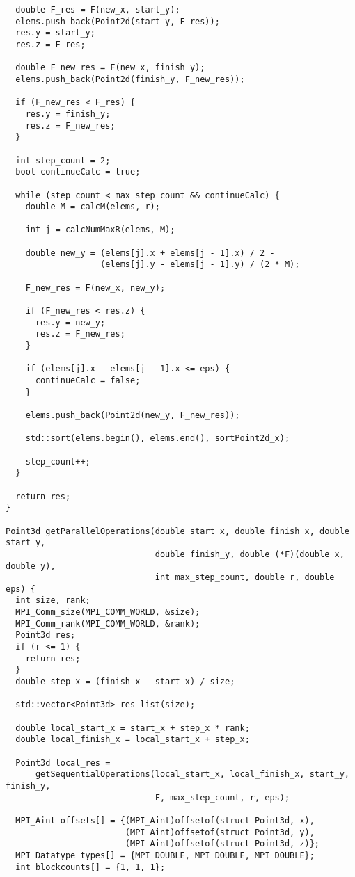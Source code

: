 \documentclass{report}
\begin{document}
\begin{lstlisting}
  double F_res = F(new_x, start_y);
  elems.push_back(Point2d(start_y, F_res));
  res.y = start_y;
  res.z = F_res;

  double F_new_res = F(new_x, finish_y);
  elems.push_back(Point2d(finish_y, F_new_res));

  if (F_new_res < F_res) {
    res.y = finish_y;
    res.z = F_new_res;
  }

  int step_count = 2;
  bool continueCalc = true;

  while (step_count < max_step_count && continueCalc) {
    double M = calcM(elems, r);

    int j = calcNumMaxR(elems, M);

    double new_y = (elems[j].x + elems[j - 1].x) / 2 -
                   (elems[j].y - elems[j - 1].y) / (2 * M);

    F_new_res = F(new_x, new_y);

    if (F_new_res < res.z) {
      res.y = new_y;
      res.z = F_new_res;
    }

    if (elems[j].x - elems[j - 1].x <= eps) {
      continueCalc = false;
    }

    elems.push_back(Point2d(new_y, F_new_res));

    std::sort(elems.begin(), elems.end(), sortPoint2d_x);

    step_count++;
  }

  return res;
}

Point3d getParallelOperations(double start_x, double finish_x, double start_y,
                              double finish_y, double (*F)(double x, double y),
                              int max_step_count, double r, double eps) {
  int size, rank;
  MPI_Comm_size(MPI_COMM_WORLD, &size);
  MPI_Comm_rank(MPI_COMM_WORLD, &rank);
  Point3d res;
  if (r <= 1) {
    return res;
  }
  double step_x = (finish_x - start_x) / size;

  std::vector<Point3d> res_list(size);

  double local_start_x = start_x + step_x * rank;
  double local_finish_x = local_start_x + step_x;

  Point3d local_res =
      getSequentialOperations(local_start_x, local_finish_x, start_y, finish_y,
                              F, max_step_count, r, eps);

  MPI_Aint offsets[] = {(MPI_Aint)offsetof(struct Point3d, x),
                        (MPI_Aint)offsetof(struct Point3d, y),
                        (MPI_Aint)offsetof(struct Point3d, z)};
  MPI_Datatype types[] = {MPI_DOUBLE, MPI_DOUBLE, MPI_DOUBLE};
  int blockcounts[] = {1, 1, 1};


\end{lstlisting}
\end{document}
